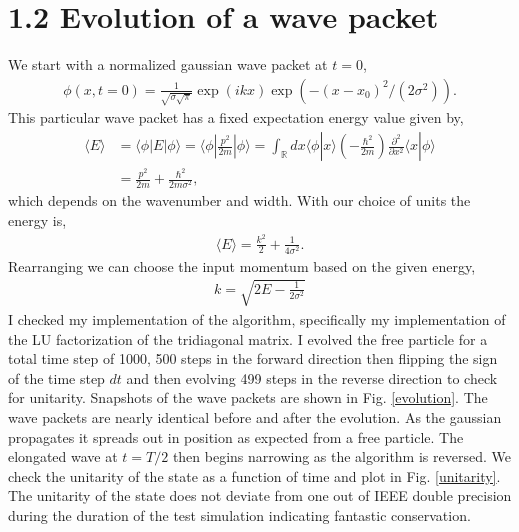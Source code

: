 \documentclass[singlepage,notitlepage,nofootinbib,11pt]{revtex4-1}
\newcommand{\eq}[1]{\begin{align*}#1\end{align*}}
\def\<{\langle}
\def\>{\rangle}
\begin{document}
\section*{1.2 Evolution of a wave packet}
We start with a normalized gaussian wave packet at $t=0$,
\eq{
\phi(x,t=0) = \frac{1}{\sqrt{\sigma \sqrt{\pi}}}\exp\left(ikx\right)\exp\left(-(x-x_0)^2/\left(2\sigma^2\right)\right).
}
This particular wave packet has a fixed expectation energy value given by,
\begin{align*}
  \<E\> &= \<\phi|E|\phi\> = \<\phi|\frac{p^2}{2m}|\phi\> = \int_{\mathbb{R}}dx\<\phi|x\>\left(-\frac{\hbar^2}{2m}\right)\frac{\partial^2}{\partial x^2}\<x|\phi\> \\
  &= \frac{p^2}{2m} + \frac{\hbar^2}{2 m \sigma^2},
\end{align*}
which depends on the wavenumber and width. With our choice of units the energy is,
\eq{
\<E\> = \frac{k^2}{2} +  \frac{1}{4\sigma^2}.
}
Rearranging we can choose the input momentum based on the given energy,
\eq{
k = \sqrt{2 E - \frac{1}{2\sigma^2}}
  }
I checked my implementation of the algorithm, specifically my implementation of the LU factorization of the tridiagonal matrix. I evolved the free particle for a total time step of 1000, 500 steps in the forward direction then flipping the sign of the time step $dt$ and then evolving 499 steps in the reverse direction to check for unitarity. Snapshots of the wave packets are shown in Fig. \ref{evolution}. The wave packets are nearly identical before and after the evolution. As the gaussian propagates it spreads out in position as expected from a free particle. The elongated wave at $t=T/2$ then begins narrowing as the algorithm is reversed. We check the unitarity of the state as a function of time and plot in Fig. \ref{unitarity}. The unitarity of the state does not deviate from one out of IEEE double precision during the duration of the test simulation indicating fantastic conservation.
\end{document}
